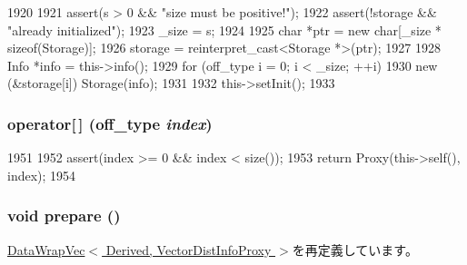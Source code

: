 \begin{DoxyCode}
1920     {
1921         assert(s > 0 && "size must be positive!");
1922         assert(!storage && "already initialized");
1923         _size = s;
1924 
1925         char *ptr = new char[_size * sizeof(Storage)];
1926         storage = reinterpret_cast<Storage *>(ptr);
1927 
1928         Info *info = this->info();
1929         for (off_type i = 0; i < _size; ++i)
1930             new (&storage[i]) Storage(info);
1931 
1932         this->setInit();
1933     }
\end{DoxyCode}
\hypertarget{classStats_1_1VectorDistBase_ad22583203a39f3bb11549cc89ba71e9d}{
\subsubsection[{operator[]}]{ operator\mbox{[}$\,$\mbox{]} ({\bf off\_\-type} {\em index})}}
\label{classStats_1_1VectorDistBase_ad22583203a39f3bb11549cc89ba71e9d}



\begin{DoxyCode}
1951     {
1952         assert(index >= 0 && index < size());
1953         return Proxy(this->self(), index);
1954     }
\end{DoxyCode}
\hypertarget{classStats_1_1VectorDistBase_a1825b40ca3bc3a1ba67fdb58fac5015c}{
\subsubsection[{prepare}]{\setlength{\rightskip}{0pt plus 5cm}void prepare ()}}
\label{classStats_1_1VectorDistBase_a1825b40ca3bc3a1ba67fdb58fac5015c}


\hyperlink{classStats_1_1DataWrapVec_a1825b40ca3bc3a1ba67fdb58fac5015c}{DataWrapVec$<$ Derived, VectorDistInfoProxy $>$}を再定義しています。


